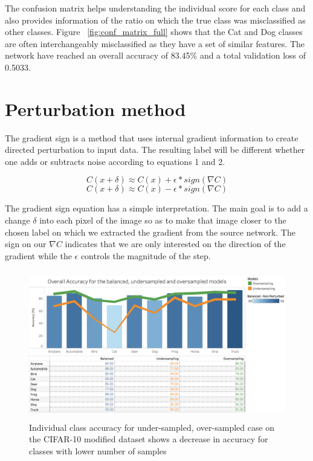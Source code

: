 The confusion matrix helps understanding the individual score for each class and also provides information of the ratio on which the true class was misclassified as other classes. Figure ~\ref{fig:conf_matrix_full} shows that the Cat and Dog classes are often interchangeably misclassified as they have a set of similar features. The network have reached an overall accuracy of 83.45\% and a total validation loss of 0.5033.

\section{Perturbation method}
The gradient sign is a method that uses internal gradient information to create directed perturbation to input data. The resulting label will be different whether one adds or subtracts noise according to equations 1 and 2. 

\begin{equation}
C(x + \delta)\approx C(x) + \epsilon * sign(\nabla C)
\end{equation}
\begin{equation}
C(x + \delta)\approx C(x) - \epsilon * sign(\nabla C)
\end{equation}

The gradient sign equation has a simple interpretation. The main goal is to add a change $\delta$ into each pixel of the image so as to make that image closer to the chosen label on which we extracted the gradient from the source network. The sign on our $\nabla C$ indicates that we are only interested on the direction of the gradient while the $\epsilon$ controls the magnitude of the step.

\begin{figure}
	\centering
	\includegraphics[height=6.5cm]{graph_non_pert.png}
	\caption{Individual class accuracy for under-sampled, over-sampled case on the CIFAR-10 modified dataset shows a decrease in accuracy for classes with lower number of samples}
	\label{fig:acc_graph}
\end{figure}

